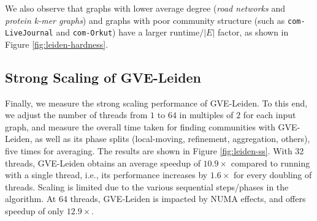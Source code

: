 We also observe that graphs with lower average degree (\textit{road networks} and \textit{protein k-mer graphs}) and graphs with poor community structure (such as \verb|com-LiveJournal| and \verb|com-Orkut|) have a larger $\text{runtime}/|E|$ factor, as shown in Figure \ref{fig:leiden-hardness}.




\subsection{Strong Scaling of GVE-Leiden}

Finally, we measure the strong scaling performance of GVE-Leiden. To this end, we adjust the number of threads from $1$ to $64$ in multiples of $2$ for each input graph, and measure the overall time taken for finding communities with GVE-Leiden, as well as its phase splits (local-moving, refinement, aggregation, others), five times for averaging. The results are shown in Figure \ref{fig:leiden-ss}. With 32 threads, GVE-Leiden obtains an average speedup of $10.9\times$ compared to running with a single thread, i.e., its performance increases by $1.6\times$ for every doubling of threads. Scaling is limited due to the various sequential steps/phases in the algorithm. At 64 threads, GVE-Leiden is impacted by NUMA effects, and offers speedup of only $12.9\times$.
